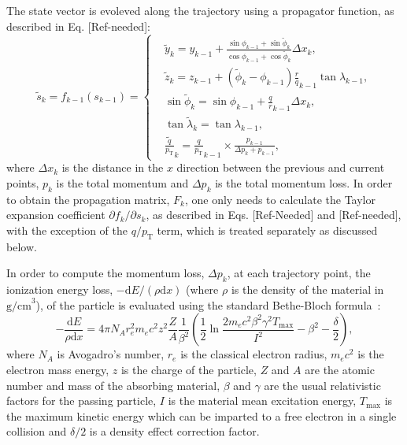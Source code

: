 The state vector is evoleved along the trajectory using a propagator function, as described in Eq. [Ref-needed]:
\begin{equation} \label{eq:func}
    \widetilde{s}_k = f_{k-1}(s_{k-1}) =
        \left\{
        	\begin{aligned}
        		& \widetilde{y}_k  =  y_{k-1}+ \frac{\sin{\phi}_{k-1}+\sin\widetilde{\phi}_k} 
                                     {\cos{\phi}_{k-1}+\cos\widetilde{\phi}_k}  \Delta x_k,  \\
        		& \widetilde{z}_k  =  z_{k-1}+\left(\widetilde{\phi}_k-\phi_{k-1}\right)\frac{r}{q}_{k-1}\tan{\lambda}_{k-1} ,\\ 
                    & \sin \widetilde{\phi}_k =  \sin \phi_{k-1} + \frac{q}{r}_{k-1}\Delta x_k,  \\               
                    & \tan \widetilde{\lambda}_k   =  \tan \lambda_{k-1}, \\   
                    & \widetilde{\frac{q}{p_{\text{T}}}}_k = \frac{q}{p_{\text{T}}}_{k-1} \times\frac{p_{k-1}}{\Delta p_k+p_{k-1}},
        	\end{aligned}
        \right.
\end{equation}
where $\Delta x_k$ is the distance in the $x$ direction between the previous and current points, $p_k$ is the total momentum and $\Delta p_k$ is the total momentum loss. In order to obtain the propagation matrix, $F_k$, one only needs to calculate the Taylor expansion coefficient $\partial f_k / \partial s_k$, as described in Eqs. [Ref-Needed] and [Ref-needed], with the exception of the $q/p_{\text{T}}$ term, which is treated separately as discussed below.

In order to compute the momentum loss, $\Delta p_k$, at each trajectory point, the ionization energy loss, $-\textrm{d}E/\left(\rho\textrm{d}x\right)$ (where $\rho$ is the density of the material in $\text{g/cm}^3$), of the particle is evaluated using the standard Bethe-Bloch formula~\cite{PDG}:
\begin{equation} \label{eq:Bethe}
    -\frac{\textrm{d}E}{\rho\textrm{d}x} = 4\pi N_{A}r_e^2m_ec^2z^2\frac{Z}{A}\frac{1}{\beta^2}\left(\frac{1}{2}\ln{\frac{2m_ec^2\beta^2\gamma^2T_{\textrm{max}}}{I^2}}-\beta^2-\frac{\delta}{2}\right),
\end{equation}
where $N_{A}$ is Avogadro's number, $r_e$ is the classical electron radius, $m_ec^2$ is the electron mass energy, $z$ is the charge of the particle, $Z$ and $A$ are the atomic number and mass of the absorbing material, $\beta$ and $\gamma$ are the usual relativistic factors for the passing particle, $I$ is the material mean excitation energy, $T_{\textrm{max}}$ is the maximum kinetic energy which can be imparted to a free electron in a single collision and $\delta/2$ is a density effect correction factor. 

